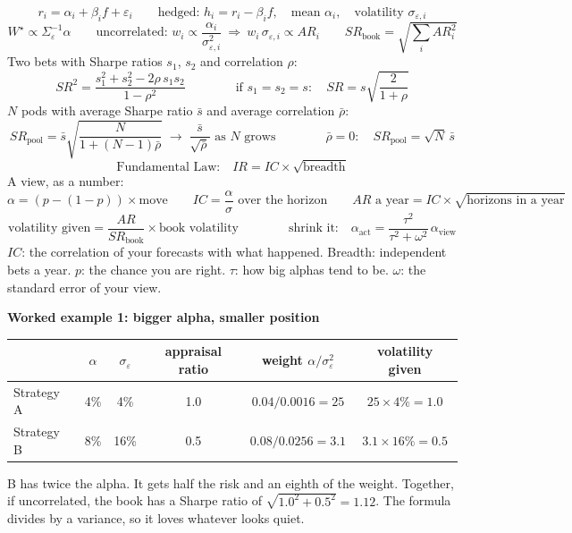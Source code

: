 \documentclass[11pt]{article}
\newcounter{ex}[section]
\newcommand{\head}[1]{\par\medskip\textbf{#1}\par}
\newcommand{\SR}{\mathit{SR}}
\newcommand{\AR}{\mathit{AR}}
\newcommand{\IR}{\mathit{IR}}
\begin{document}
\begin{keybox}
\[ r_{i} = \alpha_{i} + \beta_{i}f + \varepsilon_{i} \qquad \text{hedged: } h_{i} = r_{i} - \beta_{i}f, \quad
   \text{mean } \alpha_{i}, \quad \text{volatility } \sigma_{\varepsilon,i} \]
\[ W^{\star} \propto \Sigma_{\varepsilon}^{-1}\alpha \qquad \text{uncorrelated: } w_{i} \propto \frac{\alpha_{i}}{\sigma_{\varepsilon,i}^{2}}
   \ \Longrightarrow\ w_{i}\,\sigma_{\varepsilon,i} \propto \AR_{i}
   \qquad \SR_{\text{book}} = \sqrt{\textstyle\sum_{i}\AR_{i}^{2}} \]
Two bets with Sharpe ratios $s_{1}$, $s_{2}$ and correlation $\rho$:
\[ \SR^{2} = \frac{s_{1}^{2} + s_{2}^{2} - 2\rho\,s_{1}s_{2}}{1 - \rho^{2}} \qquad\qquad
   \text{if } s_{1} = s_{2} = s:\quad \SR = s\sqrt{\frac{2}{1+\rho}} \]
$N$ pods with average Sharpe ratio $\bar s$ and average correlation $\bar\rho$:
\[ \SR_{\text{pool}} = \bar s\sqrt{\frac{N}{1 + (N-1)\bar\rho}} \;\longrightarrow\; \frac{\bar s}{\sqrt{\bar\rho}} \text{ as } N \text{ grows}
   \qquad\qquad \bar\rho = 0:\quad \SR_{\text{pool}} = \sqrt{N}\,\bar s \]
\[ \text{Fundamental Law:}\quad \IR = IC \times \sqrt{\text{breadth}} \]
A view, as a number:
\[ \alpha = (p - (1-p)) \times \text{move} \qquad IC = \frac{\alpha}{\sigma} \text{ over the horizon}
   \qquad \AR \text{ a year} = IC\times\sqrt{\text{horizons in a year}} \]
\[ \text{volatility given} = \frac{\AR}{\SR_{\text{book}}}\times\text{book volatility}
   \qquad\qquad \text{shrink it:}\quad \alpha_{\text{act}} = \frac{\tau^{2}}{\tau^{2} + \omega^{2}}\,\alpha_{\text{view}} \]
{\small $IC$: the correlation of your forecasts with what happened. Breadth: independent bets a year. $p$: the chance
you are right. $\tau$: how big alphas tend to be. $\omega$: the standard error of your view.}
\end{keybox}

\head{Worked example 1: bigger alpha, smaller position}
\begin{center}
\begin{tabular}{lccccc}
\toprule
 & $\alpha$ & $\sigma_{\varepsilon}$ & appraisal ratio & weight $\alpha/\sigma_{\varepsilon}^{2}$ & volatility given \\
\midrule
Strategy A & 4\% & 4\% & 1.0 & $0.04/0.0016 = 25$ & $25\times 4\% = 1.0$ \\
Strategy B & 8\% & 16\% & 0.5 & $0.08/0.0256 = 3.1$ & $3.1\times 16\% = 0.5$ \\
\bottomrule
\end{tabular}
\end{center}
B has twice the alpha. It gets half the risk and an eighth of the weight. Together, if uncorrelated, the book has a
Sharpe ratio of $\sqrt{1.0^{2} + 0.5^{2}} = 1.12$. The formula divides by a variance, so it loves whatever looks quiet.
\end{document}
